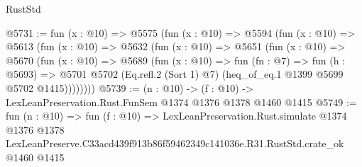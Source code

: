 \begin{lexlean}{RustStd}
\begin{coremodule}
@5731 := fun (x : @10) =>
  @5575
    (fun (x : @10) =>
    @5594
      (fun (x : @10) =>
      @5613
        (fun (x : @10) =>
        @5632
          (fun (x : @10) =>
          @5651
            (fun (x : @10) =>
            @5670
              (fun (x : @10) =>
              @5689
                (fun (x : @10) =>
                fun (fn : @7) =>
                fun (h : @5693) =>
                @5701 @5702 (Eq.refl.{2} (Sort 1) @7) (heq_of_eq.{1} @1399 @5699 @5702 @1415))))))))
@5739 := (n : @10) -> (f : @10) -> LexLeanPreservation.Rust.FunSem @1374 @1376 @1378 @1460 @1415
@5749 := fun (n : @10) =>
  fun (f : @10) =>
  LexLeanPreservation.Rust.simulate
    @1374
    @1376
    @1378
    LexLeanPreserve.C33acd439f913b86f59462349c141036e.R31.RustStd.crate_ok
    @1460
    @1415
\end{coremodule}
\end{lexlean}
